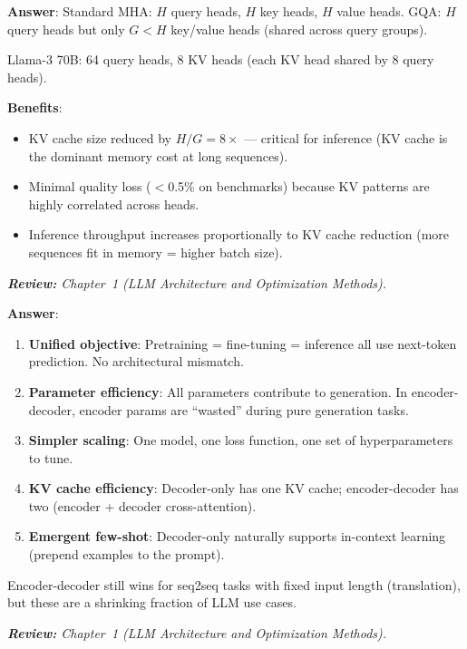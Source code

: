 \begin{questionbox}
\textbf{Answer}: Standard MHA: $H$ query heads, $H$ key heads, $H$ value heads. GQA: $H$ query heads but only $G < H$ key/value heads (shared across query groups).

Llama-3 70B: 64 query heads, 8 KV heads (each KV head shared by 8 query heads).

\textbf{Benefits}:

\begin{itemize}
  \item KV cache size reduced by $H/G = 8\times$ --- critical for inference (KV cache is the dominant memory cost at long sequences).
  \item Minimal quality loss ($<$0.5\% on benchmarks) because KV patterns are highly correlated across heads.
  \item Inference throughput increases proportionally to KV cache reduction (more sequences fit in memory = higher batch size).
\end{itemize}

\emph{\textbf{Review:} Chapter~1 (LLM Architecture and Optimization Methods).}
\end{questionbox}

\begin{questionbox}
\textbf{Answer}:

\begin{enumerate}
  \item \textbf{Unified objective}: Pretraining = fine-tuning = inference all use next-token prediction. No architectural mismatch.
  \item \textbf{Parameter efficiency}: All parameters contribute to generation. In encoder-decoder, encoder params are ``wasted'' during pure generation tasks.
  \item \textbf{Simpler scaling}: One model, one loss function, one set of hyperparameters to tune.
  \item \textbf{KV cache efficiency}: Decoder-only has one KV cache; encoder-decoder has two (encoder + decoder cross-attention).
  \item \textbf{Emergent few-shot}: Decoder-only naturally supports in-context learning (prepend examples to the prompt).
\end{enumerate}

Encoder-decoder still wins for seq2seq tasks with fixed input length (translation), but these are a shrinking fraction of LLM use cases.

\emph{\textbf{Review:} Chapter~1 (LLM Architecture and Optimization Methods).}
\end{questionbox}

